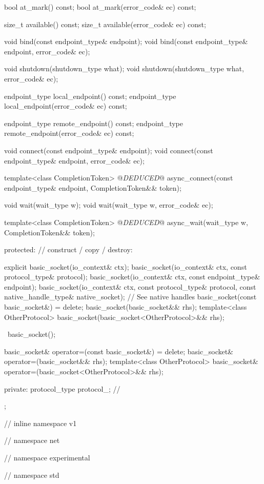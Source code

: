 \begin{codeblock}
{{{{{    bool at_mark() const;
    bool at_mark(error_code& ec) const;

    size_t available() const;
    size_t available(error_code& ec) const;

    void bind(const endpoint_type& endpoint);
    void bind(const endpoint_type& endpoint, error_code& ec);

    void shutdown(shutdown_type what);
    void shutdown(shutdown_type what, error_code& ec);

    endpoint_type local_endpoint() const;
    endpoint_type local_endpoint(error_code& ec) const;

    endpoint_type remote_endpoint() const;
    endpoint_type remote_endpoint(error_code& ec) const;

    void connect(const endpoint_type& endpoint);
    void connect(const endpoint_type& endpoint, error_code& ec);

    template<class CompletionToken>
      @\textit{DEDUCED}@ async_connect(const endpoint_type& endpoint,
                            CompletionToken&& token);

    void wait(wait_type w);
    void wait(wait_type w, error_code& ec);

    template<class CompletionToken>
      @\textit{DEDUCED}@ async_wait(wait_type w, CompletionToken&& token);

  protected:
    // construct / copy / destroy:

    explicit basic_socket(io_context& ctx);
    basic_socket(io_context& ctx, const protocol_type& protocol);
    basic_socket(io_context& ctx, const endpoint_type& endpoint);
    basic_socket(io_context& ctx, const protocol_type& protocol,
                 const native_handle_type& native_socket); // See native handles
    basic_socket(const basic_socket&) = delete;
    basic_socket(basic_socket&& rhs);
    template<class OtherProtocol>
      basic_socket(basic_socket<OtherProtocol>&& rhs);

    ~basic_socket();

    basic_socket& operator=(const basic_socket&) = delete;
    basic_socket& operator=(basic_socket&& rhs);
    template<class OtherProtocol>
      basic_socket& operator=(basic_socket<OtherProtocol>&& rhs);

  private:
    protocol_type protocol_; // \expos
  };

} // inline namespace v1
} // namespace net
} // namespace experimental
} // namespace std
\end{codeblock}

